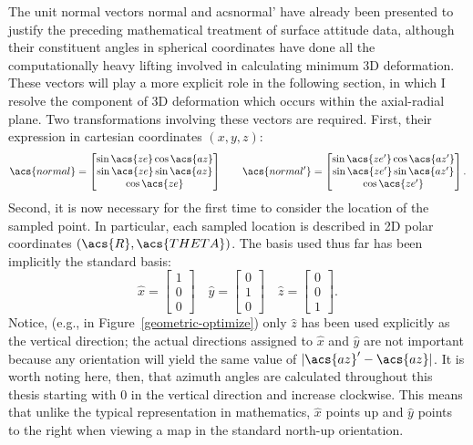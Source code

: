 
The unit normal vectors \acs{normal} and acs{normal'} have already been presented to justify the preceding mathematical treatment of surface attitude data, although their constituent angles in spherical coordinates have done all the computationally heavy lifting involved in calculating minimum 3D deformation. These vectors will play a more explicit role in the following section, in which I resolve the component of 3D deformation which occurs within the axial-radial plane. Two transformations involving these vectors are required. First, their expression in cartesian coordinates $(x,y,z)$:
\begin{equation}
    \acs{normal} = \begin{bmatrix}
        \sin\acs{ze}\cos\acs{az}\\
        \sin\acs{ze}\sin\acs{az}\\
        \cos\acs{ze}
    \end{bmatrix}\qquad
    \acs{normal'} = \begin{bmatrix}
        \sin\acs{ze'}\cos\acs{az'}\\
        \sin\acs{ze'}\sin\acs{az'}\\
        \cos\acs{ze'}
    \end{bmatrix}.\label{spherical-to-cartesian}
\end{equation}
Second, it is now necessary for the first time to consider the location of the sampled point. In particular, each sampled location is described in 2D polar coordinates $(\acs{R},\acs{THETA})$. The basis used thus far has been implicitly the standard basis:
\begin{equation}
    \hat x = \begin{bmatrix}
        1\\0\\0
    \end{bmatrix}\quad
    \hat y = \begin{bmatrix}
        0\\1\\0
    \end{bmatrix}\quad
    \hat z = \begin{bmatrix}
        0\\0\\1
    \end{bmatrix}.
\end{equation}
Notice, (e.g., in Figure~\ref{geometric-optimize}) only $\hat z$ has been used explicitly as the vertical direction; the actual directions assigned to $\hat x$ and $\hat y$ are not important because any orientation will yield the same value of $|\acs{az}'-\acs{az}|$. It is worth noting here, then, that azimuth angles are calculated throughout this thesis starting with $0$ in the vertical direction and increase clockwise. This means that unlike the typical representation in mathematics, $\hat x$ points up and $\hat y$ points to the right when viewing a map in the standard north-up orientation.

